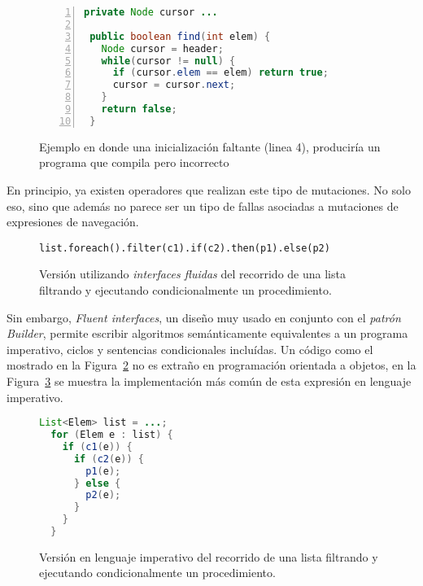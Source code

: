\begin{figure}
	\begin{lstlisting}[frame=single, numbers=left,framexleftmargin=0.073\textwidth, mathescape=true,xleftmargin=0.085\textwidth,xrightmargin=0.012\textwidth,language=Java,basicstyle={}]
 private Node cursor ...
	
 public boolean find(int elem) {
   Node cursor = header;
   while(cursor != null) {
     if (cursor.elem == elem) return true;
     cursor = cursor.next;
   }
   return false;
 }
	\end{lstlisting}
	\caption[Ejemplo de bug por inicializaci\'on faltante]{Ejemplo en donde una inicializaci\'on faltante (linea 4), producir\'ia un programa que compila pero incorrecto}
	\label{figures.examples.localVariableHidingField}
\end{figure}

En principio, ya existen operadores que realizan este tipo de mutaciones. No solo eso, sino que adem\'as no parece ser un tipo de fallas asociadas a mutaciones de expresiones de navegaci\'on.

\begin{figure}
	\begin{lstlisting}[frame=single, mathescape=true,xleftmargin=0.012\textwidth,xrightmargin=0.012\textwidth,basicstyle={}]
  list.foreach().filter(c1).if(c2).then(p1).else(p2)
	\end{lstlisting}
	\caption[Ejemplo de recorrido de una lista usando \emph{interfaces fluidas}]{Versi\'on utilizando \emph{interfaces fluidas} del recorrido de una lista filtrando y ejecutando condicionalmente un procedimiento.}
	\label{figures.examples.fluent.example1.fluent}
\end{figure}

Sin embargo, \emph{Fluent interfaces}, un dise\~no muy usado en conjunto con el \emph{patr\'on Builder}, permite escribir algoritmos sem\'anticamente equivalentes a un programa imperativo, ciclos y sentencias condicionales inclu\'idas. Un c\'odigo como el mostrado en la Figura~\ref{figures.examples.fluent.example1.fluent} no es extra\~no en programaci\'on orientada a objetos, en la Figura~\ref{figures.examples.fluent.example1.imperative} se muestra la implementaci\'on m\'as com\'un de esta expresi\'on en lenguaje imperativo.

\begin{figure}
	\begin{lstlisting}[frame=single, mathescape=true,xleftmargin=0.012\textwidth,xrightmargin=0.012\textwidth,language=Java,basicstyle={}]
  List<Elem> list = ...;
  for (Elem e : list) {
    if (c1(e)) {
      if (c2(e)) {
        p1(e);
      } else {
        p2(e);
      }
    }
  }
	\end{lstlisting}
	\caption[Versi\'on imperativa del algoritmo en la Figura~\ref{figures.examples.fluent.example1.fluent}]{Versi\'on en lenguaje imperativo del recorrido de una lista filtrando y ejecutando condicionalmente un procedimiento.}
	\label{figures.examples.fluent.example1.imperative}
\end{figure}

